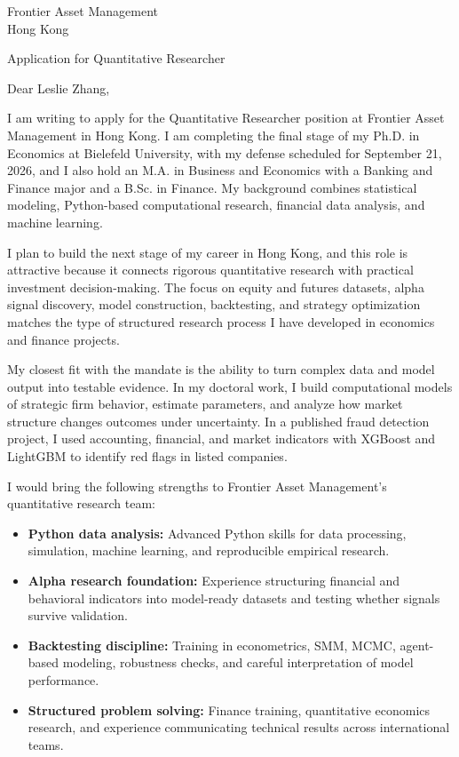 \documentclass[11pt]{article}
\begin{document}
\vspace{0.1cm}

\noindent
Frontier Asset Management \\
Hong Kong

\vspace{0.1cm}

\noindent
Application for Quantitative Researcher \\

\vspace{0.05cm}

\noindent Dear Leslie Zhang,

I am writing to apply for the Quantitative Researcher position at Frontier Asset Management in Hong Kong. 
I am completing the final stage of my Ph.D. in Economics at Bielefeld University, with my defense scheduled for September 21, 2026, 
and I also hold an M.A. in Business and Economics with a Banking and Finance major and a B.Sc. in Finance. 
My background combines statistical modeling, Python-based computational research, financial data analysis, and machine learning.

I plan to build the next stage of my career in Hong Kong, and this role is attractive because it connects rigorous quantitative research with practical investment decision-making. 
The focus on equity and futures datasets, alpha signal discovery, model construction, backtesting, and strategy optimization matches the type of structured research process I have developed in economics and finance projects.

My closest fit with the mandate is the ability to turn complex data and model output into testable evidence. 
In my doctoral work, I build computational models of strategic firm behavior, estimate parameters, and analyze how market structure changes outcomes under uncertainty. 
In a published fraud detection project, I used accounting, financial, and market indicators with XGBoost and LightGBM to identify red flags in listed companies.

I would bring the following strengths to Frontier Asset Management's quantitative research team:

\begin{itemize}
    \item \textbf{Python data analysis:} Advanced Python skills for data processing, simulation, machine learning, and reproducible empirical research.
    \item \textbf{Alpha research foundation:} Experience structuring financial and behavioral indicators into model-ready datasets and testing whether signals survive validation.
    \item \textbf{Backtesting discipline:} Training in econometrics, SMM, MCMC, agent-based modeling, robustness checks, and careful interpretation of model performance.
    \item \textbf{Structured problem solving:} Finance training, quantitative economics research, and experience communicating technical results across international teams.
\end{itemize}
\end{document}
